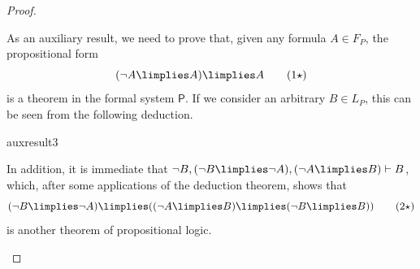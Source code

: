 \begin{proof}
\begin{parlist}
\item As an auxiliary result, we need to prove that, given any formula $A\in F_P$,  the propositional form
\begin{equation}
(\lnot A \limplies A) \limplies A
\tag{$1\star$}
\label{prelp41}
\end{equation}
is a theorem in the formal system $\mathsf{P}$. If we consider an arbitrary $B \in L_P$, this can be seen from the following deduction.
\begin{deduction}{auxresult3}
\end{deduction}

In addition, it is immediate that $\lnot B, (\lnot B \limplies \lnot A), (\lnot A \limplies B) \vdash B$, which, after some applications of the deduction theorem, shows that
\begin{equation}
(\lnot B \limplies \lnot A) \limplies ( (\lnot A \limplies B) \limplies (\lnot B \limplies B))
\tag{$2\star$}
\label{prelp42}
\end{equation}
is another theorem of propositional logic.


\end{parlist}
\end{proof}
